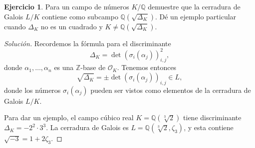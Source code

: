 \documentclass{article}
\theoremstyle{definition}
\newtheorem{ejercicio}{Ejercicio}
\newenvironment{solucion}{\begin{proof}[Solución]}{\end{proof}}
\newcommand{\ZZ}{\mathbb{Z}}
\newcommand{\QQ}{\mathbb{Q}}
\renewcommand{\O}{\mathcal{O}}
\begin{document}
\begin{ejercicio}
  Para un campo de números $K/\QQ$ demuestre que la cerradura de Galois $L/K$
  contiene como subcampo $\QQ (\sqrt{\Delta_K})$. Dé un ejemplo particular
  cuando $\Delta_K$ no es un cuadrado y $K \ne \QQ (\sqrt{\Delta_K})$.

  \ifdefined\solutions
  \begin{solucion}
    Recordemos la fórmula para el discriminante
    $$\Delta_K = \det (\sigma_i (\alpha_j))_{i,j}^2,$$
    donde $\alpha_1, \ldots, \alpha_n$ es una $\ZZ$-base de $\O_K$.
    Tenemos entonces
    $$\sqrt{\Delta_K} = \pm \det (\sigma_i (\alpha_j))_{i,j} \in L,$$
    donde los números $\sigma_i (\alpha_j)$ pueden ser vistos como elementos de
    la cerradura de Galois $L/K$.

    Para dar un ejemplo, el campo cúbico real $K = \QQ (\sqrt[3]{2})$ tiene
    discriminante $\Delta_K = -2^2\cdot 3^3$. La cerradura de Galois es
    $L = \QQ (\sqrt[3]{2},\zeta_3)$, y esta contiene $\sqrt{-3} = 1 + 2\zeta_3$.
  \end{solucion}
  \fi
\end{ejercicio}
\end{document}
